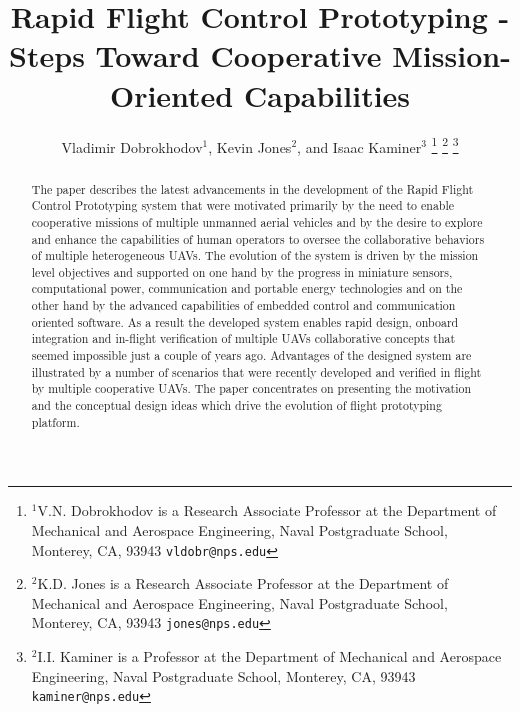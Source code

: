 \documentclass[letterpaper, 10 pt, conference]{ieeeconf}  %
\title{\LARGE \bf
Rapid Flight Control Prototyping  - Steps Toward Cooperative Mission-Oriented Capabilities}
\author{Vladimir Dobrokhodov$^{1}$, Kevin Jones$^{2}$, and Isaac Kaminer$^{3}$%
\thanks{$^{1}$V.N. Dobrokhodov is a Research Associate Professor at the Department  of Mechanical and Aerospace Engineering,
        Naval Postgraduate School, Monterey, CA, 93943
        {\tt\small vldobr@nps.edu}}%
\thanks{$^{2}$K.D. Jones is a Research Associate Professor at the Department  of Mechanical and Aerospace Engineering,
        Naval Postgraduate School, Monterey, CA, 93943
        {\tt\small jones@nps.edu}}%
\thanks{$^{2}$I.I. Kaminer is a Professor at the Department  of Mechanical and Aerospace Engineering,
        Naval Postgraduate School, Monterey, CA, 93943
        {\tt\small kaminer@nps.edu}}%
}
\begin{document}
\maketitle
\thispagestyle{empty}
\pagestyle{empty}


\begin{abstract}
The paper describes the latest advancements in the development of the Rapid Flight Control Prototyping system that were motivated primarily by the need to enable cooperative missions of multiple unmanned aerial vehicles and by the desire to explore and enhance the capabilities of human operators to oversee the collaborative behaviors of multiple heterogeneous UAVs. The evolution of the system is driven by the mission level objectives and supported on one hand by the progress in miniature sensors, computational power, communication and portable energy technologies and on the other hand by the advanced capabilities of embedded control and communication oriented software. As a result the developed system enables rapid design, onboard integration and in-flight verification of multiple UAVs collaborative concepts that seemed impossible just a couple of years ago. Advantages of the designed system are illustrated by a number of scenarios that were recently developed and verified in flight by multiple cooperative UAVs. The paper concentrates on presenting the motivation and the conceptual design ideas which drive the evolution of flight prototyping platform.
\end{abstract}
\end{document}
